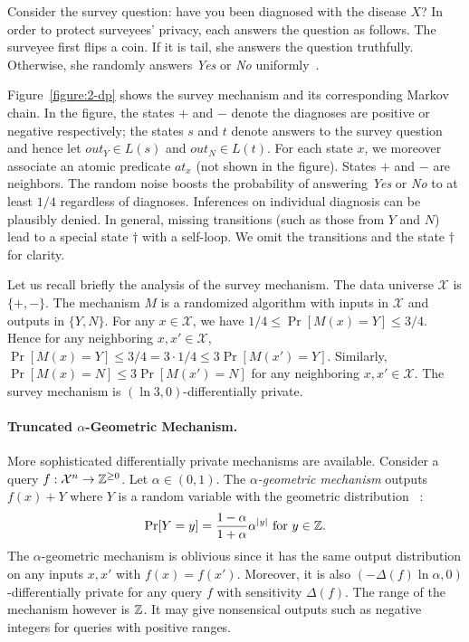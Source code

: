 Consider the survey question: have you been diagnosed
with the disease $X$? In order to protect surveyees' privacy, each
answers the question as follows. The surveyee first flips a
coin. If it is tail, she answers the question truthfully. Otherwise,
she randomly answers \textit{Yes} or \textit{No}
uniformly~\cite{DR:14:AFDP}.

\begin{example}\label{exa:survey}
  Figure~\ref{figure:2-dp} shows the survey
mechanism and its corresponding Markov chain. In the figure, the states
$+$ and $-$ denote the diagnoses are positive or negative
respectively; the states $s$ and $t$ denote answers to the survey
question and hence let $\mathit{out}_Y \in L (s)$ and $\mathit{out}_N
\in L (t)$.
For each state $x$, we moreover associate an atomic predicate
$\mathit{at}_x$ (not shown in the figure). 
States $+$ and $-$ are neighbors. 
The random noise boosts the probability of answering
\textit{Yes} or \textit{No} to at least $1/4$ regardless of
diagnoses. Inferences on individual diagnosis can be plausibly denied.
In general, missing transitions (such as those from $Y$ and $N$) lead
to a special state $\dagger$ with a self-loop. We omit the transitions
and the state $\dagger$ for clarity.
\end{example}

Let us recall briefly the analysis of the survey mechanism. The data universe
$\mathcal{X}$ is $\{ +, - \}$. The mechanism $M$ is a randomized
algorithm with inputs in $\mathcal{X}$ and outputs in $\{ Y, N
\}$. For any $x \in \mathcal{X}$, we have $1/4 \leq \Pr[M(x) = Y] \leq
3/4$. Hence for any neighboring $x, x' \in \mathcal{X}$, $\Pr[M(x) =
Y] \leq 3/4 = 3 \cdot 1/4 \leq 3 \Pr[M (x') =
Y]$. Similarly, $\Pr[M (x) = N] \leq 3 \Pr[M (x') = N]$ for any
neighboring $x, x' \in \mathcal{X}$. The survey mechanism is
$(\ln 3, 0)$-differentially private.

\paragraph{Truncated $\alpha$-Geometric Mechanism.}
More sophisticated differentially private mechanisms are
available. Consider a query
$f : \mathcal{X}^n \rightarrow \mathbb{Z}^{\geq 0}$. Let $\alpha \in (0, 1)$.
The \emph{$\alpha$-geometric mechanism}
outputs $f(x) + Y$ where $Y$ is a random variable with the geometric
distribution~\cite{GRS:09:UUPM,GRS:12:UUPM} :
\[
\Pr[Y = y] = \frac{1 - \alpha}{1 + \alpha}\alpha^{|y|}
\textmd{ for } y \in \mathbb{Z}.
\]
The $\alpha$-geometric mechanism is oblivious since it has the same
output distribution on any inputs $x, x'$ with $f (x) = f
(x')$. Moreover, it is also $(- {\Delta (f)} \ln \alpha, 0)$-differentially
private for any query $f$ with sensitivity $\Delta (f)$. The range of
the mechanism
however is $\mathbb{Z}$. It may give nonsensical outputs such as
negative integers for queries with positive ranges.

